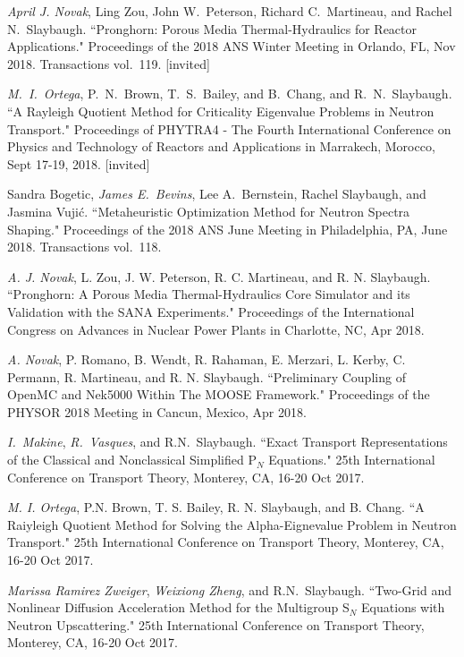 \begin{bibsection}
\item \textit{April J. Novak}, Ling Zou, John W.\ Peterson, Richard C.\ Martineau, and Rachel N.\ Slaybaugh. ``Pronghorn: Porous Media Thermal-Hydraulics for Reactor Applications." Proceedings of the 2018 ANS Winter Meeting in Orlando, FL, Nov 2018. Transactions vol.\ 119. [invited]

\item \textit{M.\ I.\ Ortega}, P.\ N.\ Brown, T.\ S.\ Bailey, and B.\ Chang, and R.\ N.\ Slaybaugh. ``A Rayleigh Quotient Method for Criticality Eigenvalue Problems in Neutron Transport." Proceedings of PHYTRA4 - The Fourth International Conference on Physics and Technology of Reactors and Applications in Marrakech, Morocco, Sept 17-19, 2018. [invited]

\item Sandra Bogetic, \textit{James E.\ Bevins}, Lee A.\ Bernstein, Rachel Slaybaugh, and Jasmina Vuji\'c. ``Metaheuristic Optimization Method for Neutron Spectra Shaping." Proceedings of the 2018 ANS June Meeting in Philadelphia, PA, June 2018. Transactions vol.\ 118. 

\item \textit{A. J. Novak}, L. Zou, J. W. Peterson, R. C. Martineau, and R. N. Slaybaugh.
``Pronghorn: A Porous Media Thermal-Hydraulics Core Simulator and its Validation with the SANA Experiments." Proceedings of the International Congress on Advances in Nuclear Power Plants in Charlotte, NC, Apr 2018. 

\item \textit{A. Novak}, P. Romano, B. Wendt, R. Rahaman, E. Merzari, L. Kerby, C. Permann, R. Martineau, and R. N. Slaybaugh. ``Preliminary Coupling of OpenMC and Nek5000 Within The MOOSE Framework." Proceedings of the PHYSOR 2018 Meeting in Cancun, Mexico, Apr 2018. 

\item  \textit{I.\ Makine}, \textit{R.\ Vasques}, and R.N.\ Slaybaugh. ``Exact Transport Representations of the Classical and Nonclassical Simplified P$_N$ Equations." 25th International Conference on Transport Theory, Monterey, CA, 16-20 Oct 2017.

\item \textit{M. I. Ortega}, P.N. Brown, T. S. Bailey, R. N. Slaybaugh, and B. Chang. ``A Raiyleigh Quotient Method for Solving the Alpha-Eignevalue Problem in Neutron Transport." 25th International Conference on Transport Theory, Monterey, CA, 16-20 Oct 2017.

\item  \textit{Marissa Ramirez Zweiger}, \textit{Weixiong Zheng}, and R.N.\ Slaybaugh. ``Two-Grid and Nonlinear Diffusion Acceleration Method for the Multigroup S$_N$ Equations with Neutron Upscattering." 25th International Conference on Transport Theory, Monterey, CA, 16-20 Oct 2017.


\end{bibsection}
